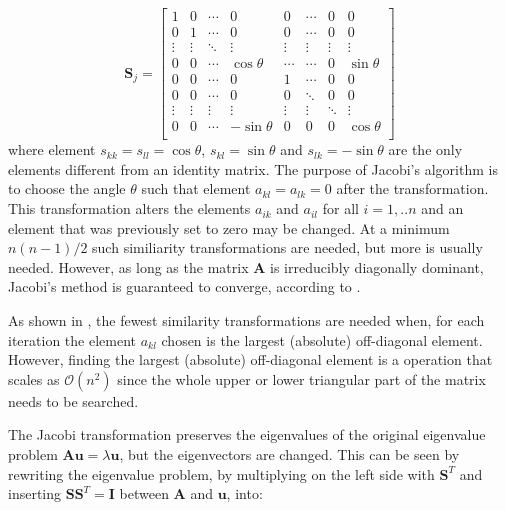 \documentclass{article}
\begin{document}
\begin{equation}
\bm{S}_j=
\begin{bmatrix}
1      & 0      & \cdots      & 0           & 0         & \cdots & 0      & 0          \\
0      & 1      & \cdots      & 0           & 0         & \cdots & 0      & 0          \\
\vdots & \vdots & \ddots      & \vdots      & \vdots    & \vdots & \vdots & \vdots     \\
0      & 0      & \cdots      & \cos\theta  & \cdots    & \cdots & 0      & \sin\theta \\
0      & 0      & \cdots      & 0           & 1         & \cdots & 0      & 0          \\
0      & 0      & \cdots      & 0           & 0         & \ddots & 0      & 0          \\
\vdots & \vdots & \vdots      & \vdots      & \vdots    & \vdots & \ddots & \vdots     \\
0      & 0      & \cdots      & -\sin\theta & 0         & 0      & 0      & \cos\theta \\
\end{bmatrix}
\end{equation}
where element $s_{kk}=s_{ll}=\cos\theta$, $s_{kl}=\sin\theta$ and $s_{lk}=-\sin\theta$ are the only elements different from an identity matrix. The purpose of Jacobi's algorithm is to choose the angle $\theta$ such that element $a_{kl}=a_{lk}=0$ after the transformation. This transformation alters the elements $a_{ik}$ and $a_{il}$ for all $i=1,..n$ and an element that was previously set to zero may be changed. At a minimum $n(n-1)/2$ such similiarity transformations are needed, but more is usually needed. However, as long as the matrix $\bm{A}$ is irreducibly diagonally dominant, Jacobi's method is guaranteed to converge, according to \cite{lectures}.

As shown in \cite{lectures}, the fewest similarity transformations are needed when, for each iteration the element $a_{kl}$ chosen is the largest (absolute) off-diagonal element. However, finding the largest (absolute) off-diagonal element is a operation that scales as $\mathcal{O}(n^2)$ since the whole upper or lower triangular part of the matrix needs to be searched. 

The Jacobi transformation preserves the eigenvalues of the original eigenvalue problem $\bm{A}\bm{u}=\lambda \bm{u}$, but the eigenvectors are changed. This can be seen by rewriting the eigenvalue problem, by multiplying on the left side with $\bm{S}^T$ and inserting $\bm{S}\bm{S}^T=\bm{I}$ between $\bm{A}$ and $\bm{u}$, into:
\end{document}
